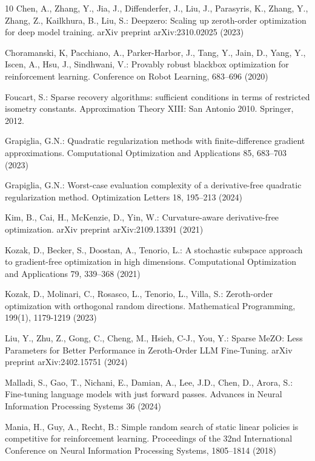 \begin{thebibliography}{10}
 Chen, A., Zhang, Y., Jia, J., Diffenderfer, J., Liu, J., Parasyris, K., Zhang, Y., Zhang, Z., Kailkhura, B., Liu, S.: Deepzero: Scaling up zeroth-order optimization for deep model training. arXiv preprint arXiv:2310.02025 (2023)

 Choramanski, K, Pacchiano, A., Parker-Harbor, J., Tang, Y., Jain, D., Yang, Y., Iscen, A., Hsu, J., Sindhwani, V.: Provably robust blackbox optimization for reinforcement learning. Conference on Robot Learning, 683--696 (2020)

 Foucart, S.: Sparse recovery algorithms: sufficient conditions in terms of restricted isometry constants. Approximation Theory XIII: San Antonio 2010. Springer, 2012.

 Grapiglia, G.N.: Quadratic regularization methods with finite-difference gradient approximations. Computational Optimization and Applications 85, 683--703 (2023)

 Grapiglia, G.N.: Worst-case evaluation complexity of a derivative-free quadratic regularization method. Optimization Letters 18, 195--213 (2024)

 Kim, B., Cai, H., McKenzie, D., Yin, W.: Curvature-aware derivative-free optimization. arXiv preprint arXiv:2109.13391 (2021)

Kozak, D., Becker, S., Doostan, A., Tenorio, L.: A stochastic subspace approach to gradient-free optimization in high dimensions. Computational Optimization and Applications 79, 339--368 (2021)

Kozak, D., Molinari, C., Rosasco, L., Tenorio, L., Villa, S.: Zeroth-order optimization with orthogonal random directions. Mathematical Programming, 199(1), 1179-1219 (2023)

 Liu, Y., Zhu, Z., Gong, C., Cheng, M., Hsieh, C-J., You, Y.: Sparse MeZO: Less Parameters for Better Performance in Zeroth-Order LLM Fine-Tuning. arXiv preprint arXiv:2402.15751 (2024)

 Malladi, S., Gao, T., Nichani, E., Damian, A., Lee, J.D., Chen, D., Arora, S.: Fine-tuning language models with just forward passes. Advances in Neural Information Processing Systems 36 (2024) 

 Mania, H., Guy, A., Recht, B.: Simple random search of static linear policies is competitive for reinforcement learning. Proceedings of the 32nd International Conference on Neural Information Processing Systems, 1805--1814 (2018)


\end{thebibliography}

